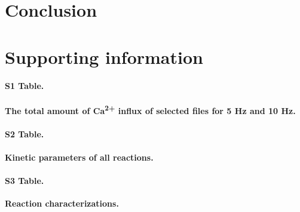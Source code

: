 \documentclass[10pt,letterpaper]{article}
\begin{document}
\section*{Conclusion}
\section*{Supporting information}





\paragraph*{S1 Table.}
\label{S1_Table}
{\bf The total amount of Ca\textsuperscript{2+} influx of selected files for 5 Hz and 10 Hz.} 
\paragraph*{S2 Table.}
\label{S2_Table}
{\bf Kinetic parameters of all reactions.}
\paragraph*{S3 Table.}
\label{S3_Table}
{\bf Reaction characterizations.}
\end{document}
